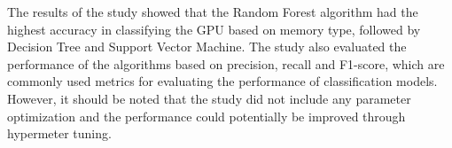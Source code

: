\documentclass[conference,onecolumn]{IEEEtran}
\begin{document}
	The results of the study showed that the Random Forest algorithm had the highest accuracy in classifying the GPU based on memory type, followed by Decision Tree and Support Vector Machine. The study also evaluated the performance of the algorithms based on precision, recall and F1-score, which are commonly used metrics for evaluating the performance of classification models. However, it should be noted that the study did not include any parameter optimization and the performance could potentially be improved through hypermeter tuning.
	
\end{document}
